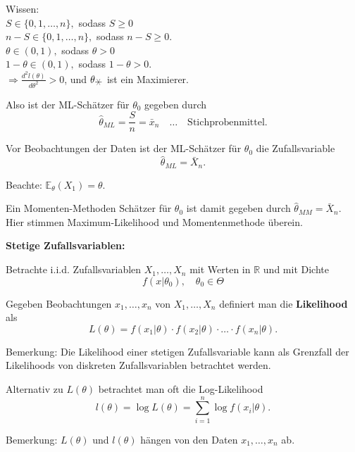 \documentclass{tstextbook}
\newcommand{\E}{\mathbb E}
\newcommand{\R}{\mathbb R}
\begin{document}
\begin{example}
	Wissen: \\
	
	$ S\in\lbrace0,1,\ldots,n\rbrace, $ sodass $ S \ge 0 $ \\
	
	$ n-S\in\lbrace0,1,\ldots,n\rbrace, $ sodass $ n-S \ge 0 $.\\
	
	$ \theta\in(0,1), $ sodass $ \theta > 0 $ \\
	
	$ 1-\theta\in(0,1), $ sodass $ 1-\theta > 0 $. \\
	
	$ \Rightarrow \frac{d^2l(\theta)}{d\theta^2} > 0 $, und $ \theta_{\hexstar} $ ist ein Maximierer.
	
	Also ist der ML-Schätzer für $ \theta_0 $ gegeben durch 
	\[
	\hat{\theta}_{ML} = \frac{S}{n} = \bar{x}_n \quad \ldots \quad \text{Stichprobenmittel}.
	\]
	
	Vor Beobachtungen der Daten ist der ML-Schätzer für $ \theta_0 $ die Zufallsvariable 
	\[
	\hat{\theta}_{ML} = \bar{X}_n.
	\]
	
	Beachte: $ \E_{\theta}(X_1)=\theta $. 
	
	Ein Momenten-Methoden Schätzer für $ \theta_0 $ ist damit gegeben durch $ \hat{\theta}_{MM} = \bar{X}_n $. Hier stimmen Maximum-Likelihood und Momentenmethode überein.
\end{example}


\textbf{Stetige Zufallsvariablen:}

Betrachte i.i.d. Zufallsvariablen $ X_1,\ldots,X_n $ mit Werten in $ \R $ und mit Dichte 
\[
f(x|\theta_0), \quad \theta_0\in\Theta
\]

Gegeben Beobachtungen $ x_1,\ldots,x_n $ von $ X_1,\ldots,X_n $ definiert man die \textbf{Likelihood} als 
\[
L(\theta) = f(x_1|\theta)\cdot f(x_2|\theta)\cdot\ldots\cdot f(x_n|\theta).
\]

\begin{remark}
	Bemerkung: Die Likelihood einer stetigen Zufallsvariable kann als Grenzfall der Likelihoods von diskreten Zufallsvariablen betrachtet werden. 
\end{remark}

Alternativ zu $ L(\theta) $ betrachtet man oft die Log-Likelihood 
\[
l(\theta) = \log L(\theta) = \sum_{i=1}^{n} \log f(x_i|\theta).
\]

\begin{remark}
	Bemerkung: $ L(\theta) $ und $ l(\theta) $ hängen von den Daten $ x_1,\ldots,x_n $ ab.
\end{remark}
\end{document}
